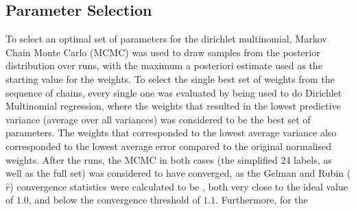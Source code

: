 
\subsection{Parameter Selection}

To select an optimal set of parameters for the dirichlet multinomial, Markov Chain Monte Carlo (MCMC) was used to draw samples from the posterior distribution  over  runs, with the maximum a posteriori estimate used as the starting value for the weights. To select the single best set of weights from the sequence of chains, every single one was evaluated by being used to do Dirichlet Multinomial regression, where the weights that resulted in the lowest predictive variance (average over all variances) was considered to be the best set of parameters. The weights that corresponded to the lowest average variance also corresponded to the lowest average error compared to the original normalised weights. After the  runs, the MCMC in both cases (the simplified 24 labels, as well as the full set) was considered to have converged, as the Gelman and Rubin ($\hat{r}$) convergence statistics were calculated to be , both very close to the ideal value of  $1.0$, and below the convergence threshold of $1.1$. Furthermore, for the 


